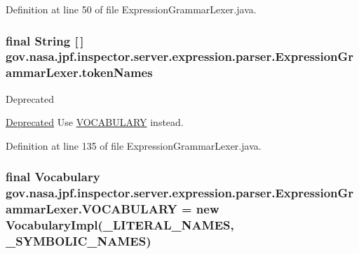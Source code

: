 Definition at line 50 of file Expression\+Grammar\+Lexer.\+java.

\subsubsection[{\texorpdfstring{token\+Names}{tokenNames}}]{\setlength{\rightskip}{0pt plus 5cm}final String \mbox{[}$\,$\mbox{]} gov.\+nasa.\+jpf.\+inspector.\+server.\+expression.\+parser.\+Expression\+Grammar\+Lexer.\+token\+Names\hspace{0.3cm}{\ttfamily [static]}}\hypertarget{classgov_1_1nasa_1_1jpf_1_1inspector_1_1server_1_1expression_1_1parser_1_1_expression_grammar_lexer_a550f651cc1875a281edf827da78e54e1}{}\label{classgov_1_1nasa_1_1jpf_1_1inspector_1_1server_1_1expression_1_1parser_1_1_expression_grammar_lexer_a550f651cc1875a281edf827da78e54e1}
\begin{DoxyRefDesc}{Deprecated}
\item[\hyperlink{deprecated__deprecated000003}{Deprecated}]Use \hyperlink{classgov_1_1nasa_1_1jpf_1_1inspector_1_1server_1_1expression_1_1parser_1_1_expression_grammar_lexer_a1fb932a63a8d524fa329e6afca465138}{V\+O\+C\+A\+B\+U\+L\+A\+RY} instead.\end{DoxyRefDesc}


Definition at line 135 of file Expression\+Grammar\+Lexer.\+java.

\subsubsection[{\texorpdfstring{V\+O\+C\+A\+B\+U\+L\+A\+RY}{VOCABULARY}}]{\setlength{\rightskip}{0pt plus 5cm}final Vocabulary gov.\+nasa.\+jpf.\+inspector.\+server.\+expression.\+parser.\+Expression\+Grammar\+Lexer.\+V\+O\+C\+A\+B\+U\+L\+A\+RY = new Vocabulary\+Impl({\bf \+\_\+\+L\+I\+T\+E\+R\+A\+L\+\_\+\+N\+A\+M\+ES}, {\bf \+\_\+\+S\+Y\+M\+B\+O\+L\+I\+C\+\_\+\+N\+A\+M\+ES})\hspace{0.3cm}{\ttfamily [static]}}\hypertarget{classgov_1_1nasa_1_1jpf_1_1inspector_1_1server_1_1expression_1_1parser_1_1_expression_grammar_lexer_a1fb932a63a8d524fa329e6afca465138}{}\label{classgov_1_1nasa_1_1jpf_1_1inspector_1_1server_1_1expression_1_1parser_1_1_expression_grammar_lexer_a1fb932a63a8d524fa329e6afca465138}


